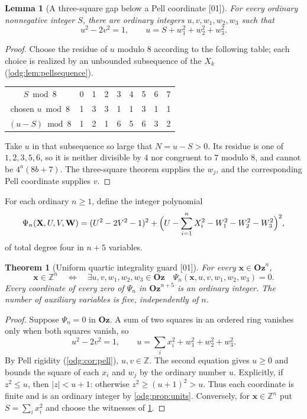 \documentclass[11pt,oneside]{article}
\numberwithin{equation}{section}
\newtheorem{theorem}{Theorem}[section]
\newtheorem{lemma}[lemma]{Lemma}
\theoremstyle{definition}
\theoremstyle{remark}
\newcommand{\Oz}{\mathbf{Oz}}
\newcommand{\Z}{\mathbb Z}
\newcommand{\src}[1]{\textup{\textsf{\small[#1]}}}
\begin{document}
\begin{lemma}[A three-square gap below a Pell coordinate \src{01}]\label{odg:lem:pellgap}
For every ordinary nonnegative integer $S$, there are ordinary integers
$u,v,w_1,w_2,w_3$ such that
\[
 u^2-2v^2=1,\qquad u=S+w_1^2+w_2^2+w_3^2.
\]
\end{lemma}
\begin{proof}
Choose the residue of $u$ modulo $8$ according to the following table; each
choice is realized by an unbounded subsequence of the $X_k$
(\cref{odg:lem:pellsequence}).
\begin{center}
\begin{tabular}{c*{8}{r}}
\toprule
$S\bmod8$&0&1&2&3&4&5&6&7\\
chosen $u\bmod8$&1&3&3&1&1&3&1&1\\
$(u-S)\bmod8$&1&2&1&6&5&6&3&2\\
\bottomrule
\end{tabular}
\end{center}
Take $u$ in that subsequence so large that $N=u-S>0$. Its residue is one of
$1,2,3,5,6$, so it is neither divisible by $4$ nor congruent to $7$
modulo $8$, and cannot be $4^a(8b+7)$. The three-square theorem supplies the
$w_j$, and the corresponding Pell coordinate supplies $v$.
\end{proof}

For each ordinary $n\geq1$, define the integer polynomial
\begin{equation}\label{odg:eq:guardpoly}
 \Psi_n(\mathbf X,U,V,\mathbf W)
 =(U^2-2V^2-1)^2
 +\Bigl(U-\sum_{i=1}^nX_i^2-W_1^2-W_2^2-W_3^2\Bigr)^2,
\end{equation}
of total degree four in $n+5$ variables.

\begin{theorem}[Uniform quartic integrality guard \src{01}]\label{odg:thm:guard}
For every $\mathbf x\in\Oz^n$,
\begin{equation}\label{odg:eq:guarddef}
 \mathbf x\in\Z^n
 \quad\Longleftrightarrow\quad
 \exists u,v,w_1,w_2,w_3\in\Oz\quad
 \Psi_n(\mathbf x,u,v,w_1,w_2,w_3)=0.
\end{equation}
Every coordinate of every zero of $\Psi_n$ in $\Oz^{n+5}$ is an ordinary
integer. The number of auxiliary variables is five, independently of $n$.
\end{theorem}
\begin{proof}
Suppose $\Psi_n=0$ in $\Oz$. A sum of two squares in an ordered ring vanishes
only when both squares vanish, so
\begin{equation}\label{odg:eq:guardrelations}
 u^2-2v^2=1,
 \qquad u=\sum_i x_i^2+w_1^2+w_2^2+w_3^2.
\end{equation}
By Pell rigidity (\cref{odg:cor:pell}), $u,v\in\Z$. The second equation
gives $u\geq0$ and bounds the square of each $x_i$ and $w_j$ by the ordinary
number $u$. Explicitly, if $z^2\le u$, then $|z|<u+1$: otherwise
$z^2\ge(u+1)^2>u$. Thus each coordinate is finite and is an ordinary
integer by \cref{odg:prop:units}.
Conversely, for $\mathbf x\in\Z^n$ put $S=\sum_i x_i^2$ and choose the
witnesses of \cref{odg:lem:pellgap}.
\end{proof}
\end{document}
